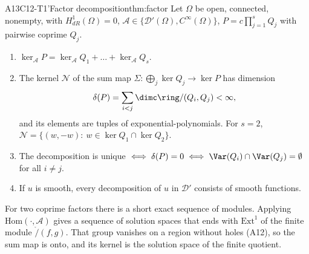 \begin{dimcard}{A13}{C12-T1'}{Factor decomposition}{\proved}{thm:factor}
\label{dim:C12-T1p}%
Let $\Omega$ be open, connected, nonempty, with $H^1_{dR}(\Omega)=0$, $\mathcal A\in\{\mathcal D'(\Omega),C^\infty(\Omega)\}$, $P=c\prod_{j=1}^sQ_j$ with pairwise coprime $Q_j$.
\begin{enumerate}[label=(\roman*)]
\item $\ker_{\mathcal A}P=\ker_{\mathcal A}Q_1+\dots+\ker_{\mathcal A}Q_s$.
\item The kernel $\mathcal N$ of the sum map $\Sigma:\bigoplus_j\ker Q_j\to\ker P$ has dimension
\[
\delta(P)=\sum_{i<j}\dimc\ring/(Q_i,Q_j)<\infty,
\]
and its elements are tuples of exponential-polynomials. For $s=2$, $\mathcal N=\{(w,-w):\ w\in\ker Q_1\cap\ker Q_2\}$.
\item The decomposition is unique $\iff\delta(P)=0\iff\Var(Q_i)\cap\Var(Q_j)=\emptyset$ for all $i\ne j$.
\item If $u$ is smooth, every decomposition of $u$ in $\mathcal D'$ consists of smooth functions.
\end{enumerate}
\end{dimcard}

\begin{proofidea}
For two coprime factors there is a short exact sequence of modules. Applying $\mathrm{Hom}(\cdot,\mathcal A)$ gives a sequence of solution spaces that ends with $\mathrm{Ext}^1$ of the finite module $\ring/(f,g)$. That group vanishes on a region without holes (A12), so the sum map is onto, and its kernel is the solution space of the finite quotient.
\end{proofidea}

